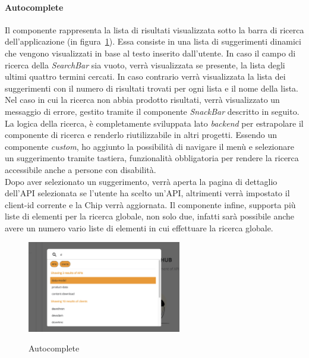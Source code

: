 \paragraph{Autocomplete}\label{par:autocomplete}
Il componente rappresenta la lista di risultati visualizzata sotto la barra di ricerca dell'applicazione (in figura~\ref{fig:autocomplete}).
Essa consiste in una lista di suggerimenti dinamici che vengono visualizzati in base al testo inserito dall'utente. 
In caso il campo di ricerca della \textit{SearchBar} sia vuoto, verrà visualizzata se presente, la lista degli ultimi quattro termini cercati.
In caso contrario verrà visualizzata la lista dei suggerimenti con il numero di risultati trovati per ogni lista e il nome della lista.
Nel caso in cui la ricerca non abbia prodotto risultati, verrà visualizzato un messaggio di errore, gestito tramite il componente \textit{SnackBar} descritto in seguito.
La logica della ricerca, è completamente sviluppata lato \textit{backend} per estrapolare il componente di ricerca e renderlo riutilizzabile in altri progetti.
Essendo un componente \textit{custom}, ho aggiunto la possibilità di navigare il menù e selezionare un suggerimento tramite tastiera, funzionalità 
obbligatoria per rendere la ricerca accessibile anche a persone con disabilità.\\
Dopo aver selezionato un suggerimento, verrà aperta la pagina di dettaglio dell'API selezionata se l'utente ha scelto un'API, altrimenti verrà impostato il client-id corrente e la Chip verrà aggiornata.
Il componente infine, supporta più liste di elementi per la ricerca globale, non solo due, infatti sarà possibile anche avere un numero vario liste di elementi in cui effettuare
la ricerca globale. 

\begin{figure}[ht]
  \centering
  \includegraphics[width=0.6\textwidth, alt={Componente che si occupa della lista dinamica di risultati}]{images/frontend/SearchBar2.jpg}
  \caption{Autocomplete}\label{fig:autocomplete}
\end{figure}

